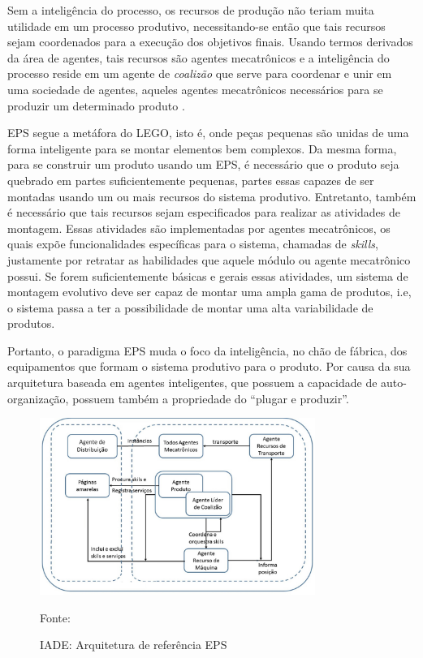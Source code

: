 Sem a inteligência do processo, os recursos de produção não teriam muita utilidade em um processo produtivo, necessitando-se então que tais recursos sejam coordenados para a execução dos objetivos finais. Usando termos derivados da área de agentes, tais recursos são agentes mecatrônicos e a inteligência do processo reside em um agente de \textit{coalizão} que serve para coordenar e unir em uma sociedade de agentes, aqueles agentes mecatrônicos necessários para se produzir um determinado produto \cite{Barata2006}.

EPS segue a metáfora do LEGO\textcopyright, isto é, onde peças pequenas são unidas de uma forma inteligente para se montar elementos bem complexos. Da mesma forma, para se construir um produto usando um EPS, é necessário que o produto seja quebrado em partes suficientemente pequenas, partes essas capazes de ser montadas usando um ou mais recursos do sistema produtivo. Entretanto, também é necessário que tais recursos sejam especificados para realizar as atividades de montagem. Essas atividades são implementadas por agentes mecatrônicos, os quais expõe funcionalidades específicas para o sistema, chamadas de \textit{skills}, justamente por retratar as habilidades que aquele módulo ou agente mecatrônico possui. Se forem suficientemente básicas e gerais essas atividades, um sistema de montagem evolutivo deve ser capaz de montar uma ampla gama de produtos, i.e, o sistema passa a ter a possibilidade de montar uma alta variabilidade de produtos.

Portanto, o paradigma EPS muda o foco da inteligência, no chão de fábrica, dos equipamentos que formam o sistema produtivo para o produto. Por causa da sua arquitetura baseada em agentes inteligentes, que possuem a capacidade de auto-organização, possuem também a propriedade do ``plugar e produzir''. 

\begin{figure}[h]
	\centering
	\includegraphics[width=0.8\textwidth]{img/F8_1_SIAPE_Arquitetura_EPS.jpg}
	\caption{IADE: Arquitetura de referência EPS}
	\label{fig:arq_referencia_eps}
	{\footnotesize{Fonte: \cite{CAVALCANTE2012a}}}
\end{figure}

